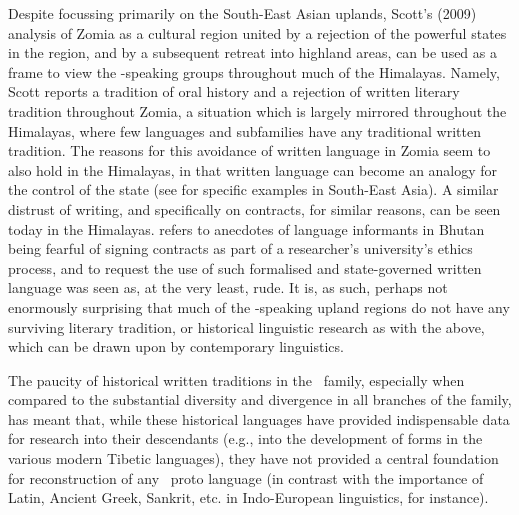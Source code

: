 Despite focussing primarily on the South-East Asian uplands, Scott's (2009) analysis of Zomia as a cultural region united by a rejection of the powerful states in the region, and by a subsequent retreat into highland areas, can be used as a frame to view the \lfam-speaking groups throughout much of the Himalayas. Namely, Scott reports a tradition of oral history and a rejection of written literary tradition throughout Zomia, a situation which is largely mirrored throughout the Himalayas, where few languages and subfamilies have any traditional written tradition. The reasons for this avoidance of written language in Zomia seem to also hold in the Himalayas, in that written language can become an analogy for the control of the state (see  for specific examples in South-East Asia). A similar distrust of writing, and specifically on contracts, for similar reasons, can be seen today in the Himalayas.  refers to anecdotes of language informants in Bhutan being fearful of signing contracts as part of a researcher's university's ethics process, and to request the use of such formalised and state-governed written language was seen as, at the very least, rude.  It is, as such, perhaps not enormously surprising that much of the \lfam-speaking upland regions do not have any surviving literary tradition, or historical linguistic research as with the above, which can be drawn upon by contemporary linguistics.

The paucity of historical written traditions in the \lfam\ family, especially when compared to the substantial diversity and divergence in all branches of the family, has meant that, while these historical languages have provided indispensable data for research into their descendants (e.g., into the development of forms in the various modern Tibetic languages), they have not provided a central foundation for reconstruction of any \lfam\ proto language \cite{STEDT} (in contrast with the importance of Latin, Ancient Greek, Sankrit, etc. in Indo-European linguistics, for instance).

